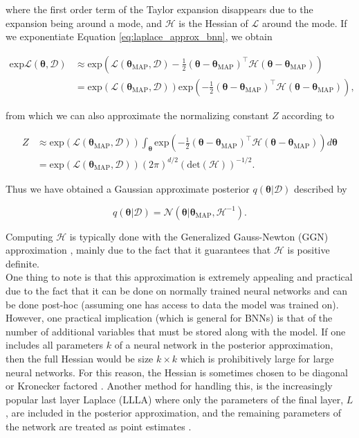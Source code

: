 \noindent where the first order term of the Taylor expansion disappears due to the expansion being around a mode, and $\mathcal{H}$ is the Hessian of $\mathcal{L}$ around the mode. If we exponentiate Equation \ref{eq:laplace_approx_bnn}, we obtain

\begin{align}
    \text{exp}\mathcal{L}(\bm{\theta}, \mathcal{D}) & \approx \text{exp}\left(\mathcal{L}(\bm{\theta}_{\text{MAP}}, \mathcal{D}) - \frac{1}{2}(\bm{\theta}-\bm{\theta}_{\text{MAP}})^\top \mathcal{H} (\bm{\theta}-\bm{\theta}_{\text{MAP}})\right) \\
    & = \text{exp}(\mathcal{L}(\bm{\theta}_{\text{MAP}}, \mathcal{D}))\text{exp}\left(-\frac{1}{2}(\bm{\theta}-\bm{\theta}_{\text{MAP}})^\top \mathcal{H} (\bm{\theta}-\bm{\theta}_{\text{MAP}})\right),
\end{align}

\noindent from which we can also approximate the normalizing constant $Z$ according to

\begin{align}
    Z & \approx \text{exp}(\mathcal{L}(\bm{\theta}_{\text{MAP}}, \mathcal{D}))\int_{\bm{\theta}} \text{exp}\left(-\frac{1}{2}(\bm{\theta}-\bm{\theta}_{\text{MAP}})^\top \mathcal{H} (\bm{\theta}-\bm{\theta}_{\text{MAP}})\right)d\bm{\theta} \\
    & = \text{exp}(\mathcal{L}(\bm{\theta}_{\text{MAP}}, \mathcal{D}))(2\pi)^{d/2}(\text{det}\left(\mathcal{H}\right))^{-1/2}.
\end{align}

\noindent Thus we have obtained a Gaussian approximate posterior $q(\bm{\theta}|\mathcal{D})$ described by

\begin{equation}
    q(\bm{\theta}|\mathcal{D}) = \mathcal{N}(\bm{\theta}|\bm{\theta}_{\text{MAP}}, \mathcal{H}^{-1}).
\end{equation}

\noindent Computing $\mathcal{H}$ is typically done with the Generalized Gauss-Newton (GGN) approximation \citep{GGN}, mainly due to the fact that it guarantees that $\mathcal{H}$ is positive definite. \\

\noindent One thing to note is that this approximation is extremely appealing and practical due to the fact that it can be done on normally trained neural networks and can be done post-hoc (assuming one has access to data the model was trained on). However, one practical implication (which is general for BNNs) is that of the number of additional variables that must be stored along with the model. If one includes all parameters $k$ of a neural network in the posterior approximation, then the full Hessian would be size $k\times k$ which is prohibitively large for large neural networks. For this reason, the Hessian is sometimes chosen to be diagonal or Kronecker factored \citep{2018_RitterKFAC}. Another method for handling this, is the increasingly popular last layer Laplace (LLLA) where only the parameters of the final layer, $L$, are included in the posterior approximation, and the remaining parameters of the network are treated as point estimates \citep{2021_DaxLastLayer}. \\


